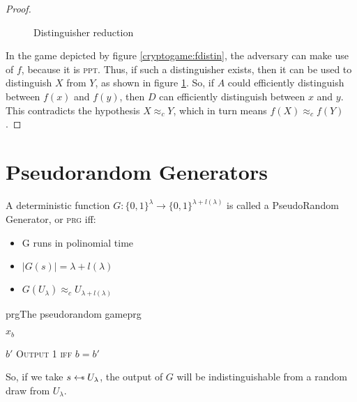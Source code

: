 \begin{proof}
\begin{figure}
        \caption{Distinguisher reduction}
        \label{fig:distredux}
    \end{figure}


    In the game depicted by figure \ref{cryptogame:fdistin}, the adversary can make use of $f$, because it is \textsc{ppt}. Thus, if such a distinguisher exists, then it can be used to distinguish $X$ from $Y$, as shown in figure \ref{fig:distredux}. So, if $A$ could efficiently distinguish between $f(x)$ and $f(y)$, then $D$ can efficiently distinguish between $x$ and $y$. This contradicts the hypothesis $X \approx_{c} Y$, which in turn means $f(X) \approx_{c} f(Y)$.

\end{proof}

\pagebreak

\section{Pseudorandom Generators}

A deterministic function $G:\{0,1\}^{\lambda} \to \{0,1\}^{\lambda + l(
\lambda)} $ is called a PseudoRandom Generator, or \textsc{prg} iff:
\begin{itemize}
    \item G runs in polinomial time
    \item $|G(s)| = \lambda + l(\lambda)$ %
    \item $G(U_{\lambda}) \approx_{c} U_{\lambda + l(\lambda)}$
\end{itemize}

\begin{cryptogame}{prg}{The pseudorandom game}{prg}
    
    {$x_b$}
    {}

    \postlevel

    \send{}
    {$b'$}
    {\textsc{Output 1 iff} $b = b'$}
    
\end{cryptogame}

So, if we take $s \pickUAR U_{\lambda}$, the output of $G$ will be indistinguishable from a random draw from $U_{\lambda}$.
